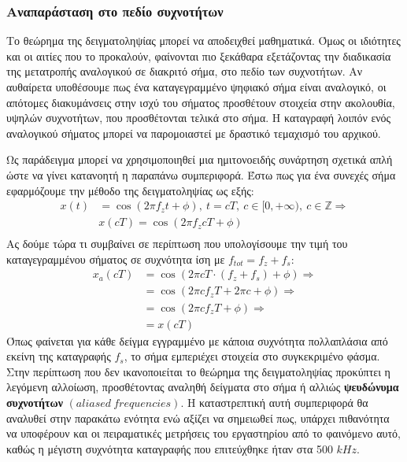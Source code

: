 \documentclass[breaklines=true, 12pt]{article}
\begin{document}
\subsubsection{Αναπαράσταση στο πεδίο συχνοτήτων}
\label{sec:orgd8c0bf4}
Το θεώρημα της δειγματοληψίας μπορεί να αποδειχθεί μαθηματικά. Όμως
οι ιδιότητες και οι αιτίες που το προκαλούν, φαίνονται πιο ξεκάθαρα
εξετάζοντας την διαδικασία της μετατροπής αναλογικού σε διακριτό σήμα,
στο πεδίο των συχνοτήτων. Αν αυθαίρετα υποθέσουμε πως ένα
καταγεγραμμένο ψηφιακό σήμα είναι αναλογικό, οι απότομες διακυμάνσεις
στην ισχύ του σήματος προσθέτουν στοιχεία στην ακολουθία, υψηλών
συχνοτήτων, που προσθέτονται τελικά στο σήμα. Η καταγραφή λοιπόν ενός
αναλογικού σήματος μπορεί να παρομοιαστεί με δραστικό τεμαχισμό του
αρχικού.

Ως παράδειγμα μπορεί να χρησιμοποιηθεί μια ημιτονοειδής συνάρτηση
σχετικά απλή ώστε να γίνει κατανοητή η παραπάνω συμπεριφορά. Έστω
πως για ένα συνεχές σήμα εφαρμόζουμε την μέθοδο της δειγματοληψίας
ως εξής:
\begin{equation}
\begin{align}
x(t)&=\cos(2 \pi f_{z}t + \phi),\ t=cT,\ c \in [0, +\infty),\ c \in \mathbb{Z} \Rightarrow \\
&x(cT) = \cos(2 \pi f_{z} cT + \phi) \\
\end{align}
\end{equation}
Ας δούμε τώρα τι συμβαίνει σε περίπτωση που υπολογίσουμε την τιμή
του καταγεγραμμένου σήματος σε συχνότητα ίση με \(f_{tot} = f_{z}+f_{s}\):
\begin{equation}
\begin{align}
x_{a}(cT) &= \cos(2 \pi cT \cdot (f_{z}+f_{s})+ \phi) \Rightarrow \\
&= \cos(2 \pi cf_{z}T + 2 \pi c + \phi) \Rightarrow \\
&= \cos(2 \pi cf_{z}T + \phi) \Rightarrow \\
&= x(cT)
\end{align}
\end{equation}
Όπως φαίνεται για κάθε δείγμα εγγραμμένο με κάποια συχνότητα
πολλαπλάσια από εκείνη της καταγραφής \(f_{s}\), το σήμα εμπεριέχει στοιχεία
στο συγκεκριμένο φάσμα. Στην περίπτωση που δεν ικανοποιείται το θεώρημα
της δειγματοληψίας προκύπτει η λεγόμενη αλλοίωση, προσθέτοντας αναληθή
δείγματα στο σήμα ή αλλιώς \textbf{ψευδώνυμα συχνοτήτων} \((aliased\ frequencies)\).
Η καταστρεπτική αυτή συμπεριφορά θα αναλυθεί στην παρακάτω ενότητα ενώ
αξίζει να σημειωθεί πως, υπάρχει πιθανότητα να υποφέρουν και οι πειραματικές
μετρήσεις του εργαστηρίου από το φαινόμενο αυτό, καθώς η μέγιστη συχνότητα
καταγραφής που επιτεύχθηκε ήταν στα 500 \(kHz\).
\end{document}
